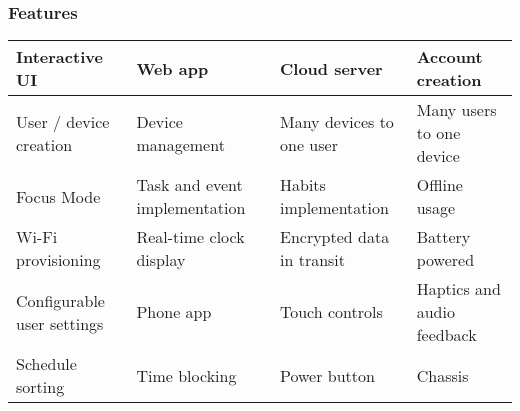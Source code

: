 \documentclass{beamer}
\begin{document}
\begin{frame}
  \frametitle{Features}
  \begin{table}
    \centering
    \small
    \begin{tabular}{|p{}|p{}|p{}|p{}|}
      \hline
      \cellcolor[HTML]{CFE2F3}Interactive UI           & \cellcolor[HTML]{CFE2F3}Web app                       & \cellcolor[HTML]{CFE2F3}Cloud server               & \cellcolor[HTML]{CFE2F3}Account creation         \\ \hline
      \cellcolor[HTML]{CFE2F3}User / device creation   & \cellcolor[HTML]{CFE2F3}Device management             & \cellcolor[HTML]{CFE2F3}Many devices to one user   & \cellcolor[HTML]{CFE2F3}Many users to one device \\ \hline
      \cellcolor[HTML]{CFE2F3}Focus Mode               & \cellcolor[HTML]{CFE2F3}Task and event implementation & \cellcolor[HTML]{CFE2F3}Habits implementation      & \cellcolor[HTML]{CFE2F3}Offline usage            \\ \hline
      \cellcolor[HTML]{CFE2F3}Wi-Fi provisioning       & \cellcolor[HTML]{CFE2F3}Real-time clock display       & \cellcolor[HTML]{CFE2F3} Encrypted data in transit & Battery powered                                  \\ \hline
      Configurable user settings                       & Phone app                                             & Touch controls                                     & Haptics and audio feedback                       \\ \hline
      Schedule sorting                                 & Time blocking                                         & Power button                                       & Chassis                                       \\ \hline
    \end{tabular}
  \end{table}

  \renewcommand{\thefootnote}{\roman{footnote}}
\end{frame}
\end{document}
